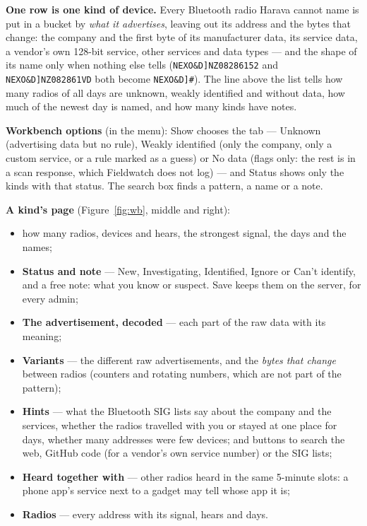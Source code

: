 \documentclass[10pt,a4paper]{article}
\newcommand{\ui}[1]{\textsf{\small #1}}            %
\newcommand{\lead}[1]{\textbf{#1}\enspace}           %
\begin{document}
\lead{One row is one kind of device.} Every Bluetooth radio Harava cannot name is put in a bucket by \emph{what it advertises}, leaving out its address and the bytes that change: the company and the first byte of its manufacturer data, its service data, a vendor's own 128-bit service, other services and data types --- and the shape of its name only when nothing else tells (\texttt{NEXO\&D]NZ08286152} and \texttt{NEXO\&D]NZ082861VD} both become \texttt{NEXO\&D]\#}). The line above the list tells how many radios of all days are unknown, weakly identified and without data, how much of the newest day is named, and how many kinds have notes.

\lead{Workbench options} (in the menu): \ui{Show} chooses the tab --- \ui{Unknown} (advertising data but no rule), \ui{Weakly identified} (only the company, only a custom service, or a rule marked as a guess) or \ui{No data} (flags only: the rest is in a scan response, which Fieldwatch does not log) --- and \ui{Status} shows only the kinds with that status. The search box finds a pattern, a name or a note.

\lead{A kind's page} (Figure~\ref{fig:wb}, middle and right):
\begin{itemize}[leftmargin=1.2em]
\item how many radios, devices and hears, the strongest signal, the days and the names;
\item \textbf{Status and note} --- \ui{New}, \ui{Investigating}, \ui{Identified}, \ui{Ignore} or \ui{Can't identify}, and a free note: what you know or suspect. \ui{Save} keeps them on the server, for every admin;
\item \textbf{The advertisement, decoded} --- each part of the raw data with its meaning;
\item \textbf{Variants} --- the different raw advertisements, and the \emph{bytes that change} between radios (counters and rotating numbers, which are not part of the pattern);
\item \textbf{Hints} --- what the Bluetooth SIG lists say about the company and the services, whether the radios travelled with you or stayed at one place for days, whether many addresses were few devices; and buttons to search the web, GitHub code (for a vendor's own service number) or the SIG lists;
\item \textbf{Heard together with} --- other radios heard in the same 5-minute slots: a phone app's service next to a gadget may tell whose app it is;
\item \textbf{Radios} --- every address with its signal, hears and days.
\end{itemize}
\end{document}
